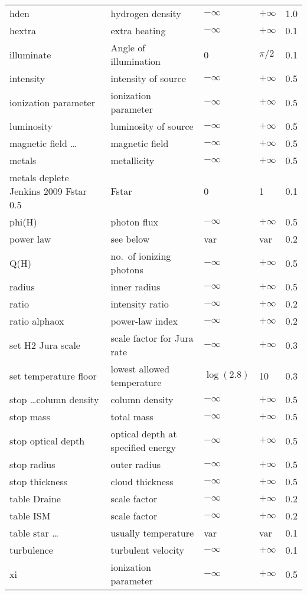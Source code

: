 \begin{table}
\begin{tabular}{lllll}
hden& hydrogen density& $-\infty$& $+\infty$& 1.0\\
hextra& extra heating& $-\infty$& $+\infty$& 0.1\\
illuminate& Angle of illumination& 0& $\pi/2$& 0.1\\
intensity& intensity of source& $-\infty$& $+\infty$& 0.5\\
ionization parameter& ionization parameter& $-\infty$& $+\infty$& 0.5\\
luminosity& luminosity of source& $-\infty$& $+\infty$& 0.5\\
magnetic field \ldots& magnetic field& $-\infty$& $+\infty$& 0.5\\
metals& metallicity& $-\infty$& $+\infty$& 0.5\\
metals deplete Jenkins 2009 Fstar 0.5 & Fstar & 0 & 1 & 0.1 \\
phi(H)& photon flux& $-\infty$& $+\infty$& 0.5\\
power law& see below& var& var& 0.2\\
Q(H)& no.\ of ionizing photons& $-\infty$& $+\infty$& 0.5\\
radius& inner radius& $-\infty$& $+\infty$& 0.5\\
ratio& intensity ratio& $-\infty$& $+\infty$& 0.2\\
ratio alphaox& power-law index& $-\infty$& $+\infty$& 0.2\\
set H2 Jura scale& scale factor for Jura rate& $-\infty$& $+\infty$& 0.3\\
set temperature floor& lowest allowed temperature& $\log(2.8)$& 10& 0.3\\
stop \ldots column density& column density& $-\infty$& $+\infty$& 0.5\\
stop mass & total mass& $-\infty$& $+\infty$& 0.5\\
stop optical depth& optical depth at specified energy & $-\infty$& $+\infty$& 0.5\\
stop radius& outer radius& $-\infty$& $+\infty$& 0.5\\
stop thickness& cloud thickness& $-\infty$& $+\infty$& 0.5\\
table Draine& scale factor& $-\infty$& $+\infty$& 0.2\\
table ISM& scale factor& $-\infty$& $+\infty$& 0.2\\
table star \ldots& usually temperature& var& var& 0.1\\
turbulence& turbulent velocity& $-\infty$& $+\infty$& 0.1\\
xi& ionization parameter& $-\infty$& $+\infty$& 0.5\\
\hline
\end{tabular}
\end{table}


